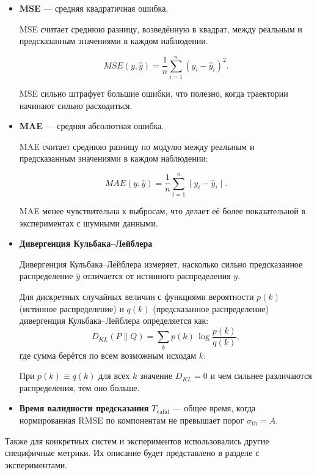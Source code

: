 \documentclass[PMI,VKR]{HSEUniversity}
\begin{document}
\begin{itemize}
    \item \textbf{MSE} — средняя квадратичная ошибка.

    MSE считает среднюю разницу, возведённую в квадрат, между реальным
    и предсказанным значениями в каждом наблюдении. 

    \[
    MSE(y, \hat{y}) = \frac{1}{n} \sum_{i=1}^{n}
    \left( y_i - \hat{y}_i \right)^2.
    \]

    MSE сильно штрафует большие ошибки, что полезно, когда траектории начинают
    сильно расходиться. 
    
    \item \textbf{MAE} — средняя абсолютная ошибка.

    MAE считает среднюю разницу по модулю между реальным и
    предсказанным значениями в каждом наблюдении:

    \[
    MAE(y, \hat{y}) = \frac{1}{n} \sum_{i=1}^{n}
    \mid  y_i - \hat{y}_i  \mid .
    \]

    MAE менее чувствительна к выбросам, что делает её более показательной в
    экспериментах с шумными данными.
 
    \item \textbf{Дивергенция Кульбака–Лейблера}

    Дивергенция Кульбака–Лейблера \cite{kullback1951information} измеряет, насколько сильно предсказанное
    распределение $\hat{y}$ отличается от истинного распределения $y$.
    
    Для дискретных случайных величин с функциями вероятности $p(k)$
    (истинное распределение) и $q(k)$ (предсказанное распределение)
    дивергенция Кульбака–Лейблера определяется как:
    \[
    D_{KL}(P \parallel Q) = \sum_{k} p(k) \, \log \frac{p(k)}{q(k)},
    \]
    где сумма берётся по всем возможным исходам $k$.
    
    При $p(k) \equiv q(k)$ для всех $k$ значение $D_{KL} = 0$ и чем сильнее различаются
    распределения, тем оно больше.

    \item \textbf{Время валидности предсказания}
    $T_{\text{valid}}$ — общее время, когда нормированная RMSE по
    компонентам не превышает порог $\sigma_{\text{th}} = A$.


\end{itemize}

Также для конкретных систем и экспериментов использовались другие специфичные метрики. Их описание будет представлено в разделе с экспериментами.
\end{document}
